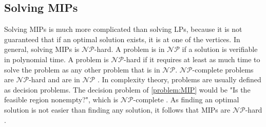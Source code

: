 \subsection*{Solving MIPs} %
Solving MIPs is much more complicated than solving LPs, because it is not guaranteed that if an optimal solution exists, it is at one of the vertices. 
In general, solving MIPs is $\mathcal{NP}$-hard. A problem is in $\mathcal{NP}$ if a solution is verifiable in polynomial time. A problem is $\mathcal{NP}$-hard if it requires at least as much time to solve the problem as any other problem that is in $\mathcal{NP}$. $\mathcal{NP}$-complete problems are $\mathcal{NP}$-hard and are in $\mathcal{NP}$ \cite{CormenIntroduction}. 
In complexity theory, problems are usually defined as decision problems. 
The decision problem of \cref{problem:MIP} would be "Is the feasible region nonempty?", which is $\mathcal{NP}$-complete \cite{integer_programming}. 
As finding an optimal solution is not easier than finding any solution, it follows that MIPs are $\mathcal{NP}$-hard \cite{integer_programming}.

